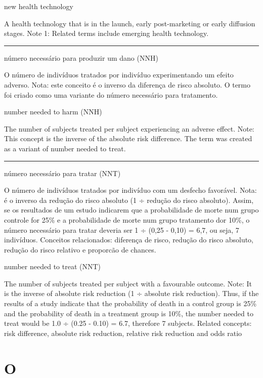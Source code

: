 \documentclass[
]{book}
\begin{document}
new health technology

A health technology that is in the launch, early post-marketing or early diffusion stages. Note 1: Related terms include emerging health technology.

\begin{center}\rule{0.5\linewidth}{0.5pt}\end{center}

número necessário para produzir um dano (NNH)

O número de indivíduos tratados por indivíduo experimentando um efeito adverso. Nota: este conceito é o inverso da diferença de risco absoluto. O termo foi criado como uma variante do número necessário para tratamento.

number needed to harm (NNH)

The number of subjects treated per subject experiencing an adverse effect. Note: This concept is the inverse of the absolute risk difference. The term was created as a variant of number needed to treat.

\begin{center}\rule{0.5\linewidth}{0.5pt}\end{center}

número necessário para tratar (NNT)

O número de indivíduos tratados por indivíduo com um desfecho favorável. Nota: é o inverso da redução do risco absoluto (1 ÷ redução do risco absoluto). Assim, se os resultados de um estudo indicarem que a probabilidade de morte num grupo controle for 25\% e a probabilidade de morte num grupo tratamento dor 10\%, o número necessário para tratar deveria ser 1 ÷ (0,25 - 0,10) = 6,7, ou seja, 7 indivíduos. Conceitos relacionados: diferença de risco, redução do risco absoluto, redução do risco relativo e proporcão de chances.

number needed to treat (NNT)

The number of subjects treated per subject with a favourable outcome. Note: It is the inverse of absolute risk reduction (1 ÷ absolute risk reduction). Thus, if the results of a study indicate that the probability of death in a control group is 25\% and the probability of death in a treatment group is 10\%, the number needed to treat would be 1.0 ÷ (0.25 - 0.10) = 6.7, therefore 7 subjects. Related concepts: risk difference, absolute risk reduction, relative risk reduction and odds ratio

\hypertarget{o}{%
\chapter*{O}\label{o}}
\end{document}
